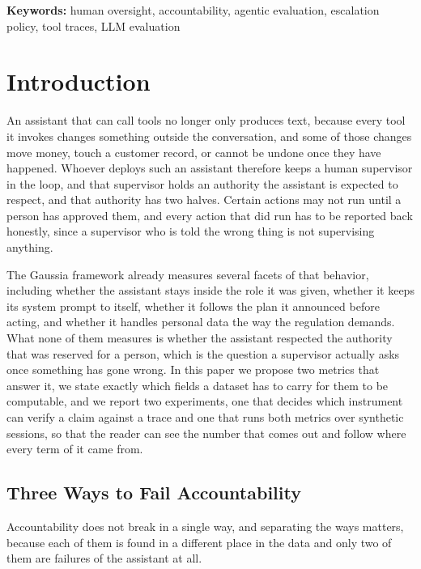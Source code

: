 \documentclass[11pt,a4paper]{article}
\providecommand{\keywords}[1]{%
  \vspace{0.5em}%
  \noindent\textbf{Keywords: }#1%
}
\begin{document}
\keywords{human oversight, accountability, agentic evaluation, escalation policy,
tool traces, LLM evaluation}

\section{Introduction}

An assistant that can call tools no longer only produces text, because every tool
it invokes changes something outside the conversation, and some of those changes
move money, touch a customer record, or cannot be undone once they have happened.
Whoever deploys such an assistant therefore keeps a human supervisor in the loop,
and that supervisor holds an authority the assistant is expected to respect, and
that authority has two halves. Certain actions may not run until a person has
approved them, and every action that did run has to be reported back honestly,
since a supervisor who is told the wrong thing is not supervising anything.

The Gaussia framework already measures several facets of that behavior, including
whether the assistant stays inside the role it was given, whether it keeps its
system prompt to itself, whether it follows the plan it announced before acting,
and whether it handles personal data the way the regulation demands. What none of
them measures is whether the assistant respected the authority that was reserved
for a person, which is the question a supervisor actually asks once something has
gone wrong. In this paper we propose two metrics that answer it, we state exactly
which fields a dataset has to carry for them to be computable, and we report two
experiments, one that decides which instrument can verify a claim against a trace and
one that runs both metrics over synthetic sessions, so that the reader can see the
number that comes out and follow where every term of it came from.

\subsection{Three Ways to Fail Accountability}
\label{sec:threeways}

Accountability does not break in a single way, and separating the ways matters,
because each of them is found in a different place in the data and only two of
them are failures of the assistant at all.
\end{document}
